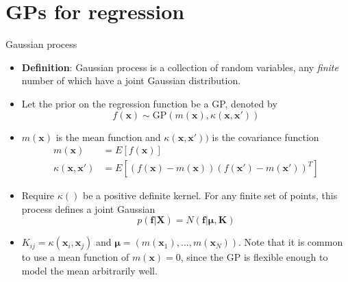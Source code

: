 \documentclass[10pt,mathserif]{beamer}
\begin{document}
\section{GPs for regression}
\begin{frame}{Gaussian process}
\begin{itemize}
    \item \textbf{Definition}: Gaussian process is a collection of random variables, any \textit{finite} number of which have a joint Gaussian distribution.
    \item Let the prior on the regression function be a GP, denoted by 
    \begin{equation*}
        f(\bm{x}) \sim \text{GP}(m(\bm{x}), \kappa(\bm{x}, \bm{x'})) 
    \end{equation*}
    \item $m(\bm{x})$ is the mean function and $\kappa(\bm{x}, \bm{x'}))$ is the covariance function
    \begin{equation*}
        \begin{split}
            m(\bm{x}) & = E[f(\bm{x})] \\
            \kappa(\bm{x}, \bm{x'}) & = E [ (f(\bm{x}) - m(\bm{x}))(f(\bm{x'} ) - m(\bm{x'} ))^T] 
        \end{split}
    \end{equation*}
    \item Require $\kappa()$ be a positive definite kernel. For any finite set of points, this process defines a joint Gaussian
    \begin{equation*}
        p(\bm{f}|\bm{X}) = N (\bm{f}|\bm{\mu}, \bm{K})
    \end{equation*}
    \item $K_{ij} = \kappa(\bm{x}_i, \bm{x}_j )$ and $\bm{\mu} = (m(\bm{x}_1),\ldots,m(\bm{x}_N ))$. Note that it is common to use a mean function of $m(\bm{x})=0$, since the GP is flexible enough to model the mean arbitrarily well.
\end{itemize}    
\end{frame}
\end{document}

